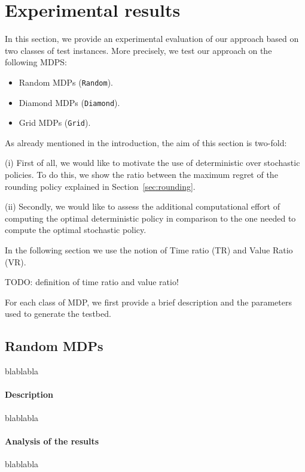 \section{Experimental results}\label{sec:experiments}

In this section, we provide an experimental evaluation of our approach
based on two classes of test instances. More precisely, we test our approach on the following MDPS:
\begin{itemize}
\item Random MDPs (\texttt{Random}).
\item Diamond MDPs (\texttt{Diamond}).
\item Grid MDPs (\texttt{Grid}).
\end{itemize}

As already mentioned in the introduction, the aim of this section is two-fold:

(i) First of all, we would like to motivate the use of deterministic over stochastic policies. To do this, we show the ratio between the maximum regret of the rounding policy explained in Section~\ref{sec:rounding}. 
%

(ii) Secondly, we would like to assess the additional computational effort of computing the optimal deterministic policy in comparison to the one needed to compute the optimal stochastic policy. 	 

In the following section we use the notion of Time ratio (TR) and Value Ratio (VR).

TODO: definition of time ratio and value ratio!

For each class of MDP, we first provide a brief description and the parameters used to generate the testbed.

\subsection{Random MDPs}
blablabla
\paragraph{Description}
blablabla
\paragraph{Analysis of the results}
blablabla


